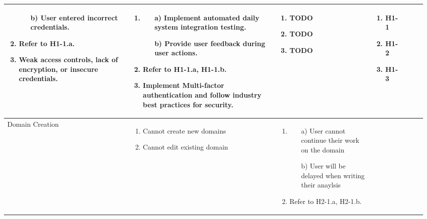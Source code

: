 \documentclass{article}
\begin{document}
\begin{landscape}
\begin{longtable}{|p{3cm}|p{3cm}|p{4cm}|p{4cm}|p{3cm}|p{2cm}|p{3cm}|}
\begin{enumerate}[leftmargin=*]
\begin{enumerate}
        \item[b)] User entered incorrect credentials.
    \end{enumerate}
    \item Refer to H1-1.a.
    \item Weak access controls, lack of encryption, or insecure credentials.
  \end{enumerate} &
  \begin{enumerate}[leftmargin=*]
    \item 
    \begin{enumerate}
        \item[a)] Implement automated daily system integration testing.
        \item[b)] Provide user feedback during user actions.
    \end{enumerate}
    \item Refer to H1-1.a, H1-1.b.
    \item Implement Multi-factor authentication and follow industry best practices for security.
  \end{enumerate} &
  \begin{enumerate}[leftmargin=*]
    \item TODO
    \item TODO
    \item TODO
  \end{enumerate} &
  \begin{enumerate}[leftmargin=*]
    \item H1-1
    \item H1-2
    \item H1-3
  \end{enumerate} \\
  \hline
    Domain Creation & 
  \begin{enumerate}[leftmargin=*]
      \item Cannot create new domains
      \item Cannot edit existing domain
  \end{enumerate} & 
  \begin{enumerate}[leftmargin=*]
    \item
    \begin{enumerate}
        \item[a)] User cannot continue their work on the domain
        \item[b)] User will be delayed when writing their anaylsis
    \end{enumerate}
    \item Refer to H2-1.a, H2-1.b.

\end{enumerate}
\end{longtable}
\end{landscape}
\end{document}
